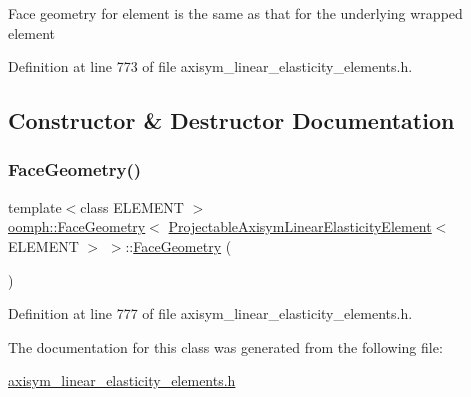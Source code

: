 Face geometry for element is the same as that for the underlying wrapped element 

Definition at line 773 of file axisym\+\_\+linear\+\_\+elasticity\+\_\+elements.\+h.



\subsection{Constructor \& Destructor Documentation}
\mbox{\label{classoomph_1_1FaceGeometry_3_01ProjectableAxisymLinearElasticityElement_3_01ELEMENT_01_4_01_4_ac822b4f3ff1ed252ba798eaa3bf0de89}} 
\subsubsection{\texorpdfstring{Face\+Geometry()}{FaceGeometry()}}
{\footnotesize\ttfamily template$<$class E\+L\+E\+M\+E\+NT $>$ \\
\hyperlink{classoomph_1_1FaceGeometry}{oomph\+::\+Face\+Geometry}$<$ \hyperlink{classoomph_1_1ProjectableAxisymLinearElasticityElement}{Projectable\+Axisym\+Linear\+Elasticity\+Element}$<$ E\+L\+E\+M\+E\+NT $>$ $>$\+::\hyperlink{classoomph_1_1FaceGeometry}{Face\+Geometry} (\begin{DoxyParamCaption}{ }\end{DoxyParamCaption})\hspace{0.3cm}{\ttfamily [inline]}}



Definition at line 777 of file axisym\+\_\+linear\+\_\+elasticity\+\_\+elements.\+h.



The documentation for this class was generated from the following file\+:\begin{DoxyCompactItemize}
\item 
\hyperlink{axisym__linear__elasticity__elements_8h}{axisym\+\_\+linear\+\_\+elasticity\+\_\+elements.\+h}\end{DoxyCompactItemize}
